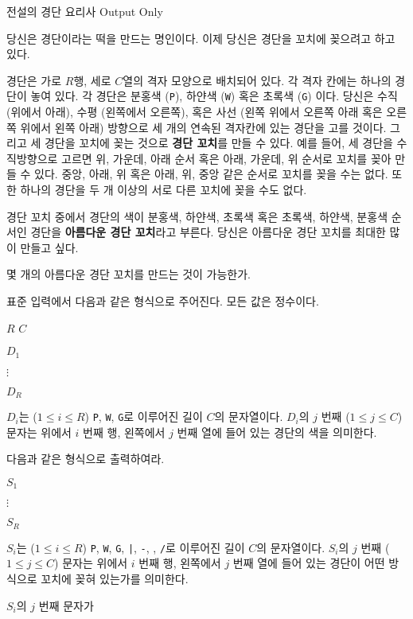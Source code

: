 \begin{problem}{전설의 경단 요리사}
	{}{Output Only}
	{}{}{}
	
	당신은 경단이라는 떡을 만드는 명인이다. 이제 당신은 경단을 꼬치에 꽂으려고 하고 있다.
	
	경단은 가로 $R$행, 세로 $C$열의 격자 모양으로 배치되어 있다. 각 격자 칸에는 하나의 경단이 놓여 있다. 각 경단은 분홍색 (\texttt{P}), 하얀색 (\texttt{W}) 혹은 초록색 (\texttt{G}) 이다. 당신은 수직 (위에서 아래), 수평 (왼쪽에서 오른쪽), 혹은 사선 (왼쪽 위에서 오른쪽 아래 혹은 오른쪽 위에서 왼쪽 아래) 방향으로 세 개의 연속된 격자칸에 있는 경단을 고를 것이다. 그리고 세 경단을 꼬치에 꽂는 것으로 \textbf{경단 꼬치}를 만들 수 있다. 예를 들어, 세 경단을 수직방향으로 고르면 위, 가운데, 아래 순서 혹은 아래, 가운데, 위 순서로 꼬치를 꽂아 만들 수 있다. 중앙, 아래, 위 혹은 아래, 위, 중앙 같은 순서로 꼬치를 꽂을 수는 없다. 또한 하나의 경단을 두 개 이상의 서로 다른 꼬치에 꽂을 수도 없다.
	
	경단 꼬치 중에서 경단의 색이 분홍색, 하얀색, 초록색 혹은 초록색, 하얀색, 분홍색 순서인 경단을 \textbf{아름다운 경단 꼬치}라고 부른다. 당신은 아름다운 경단 꼬치를 최대한 많이 만들고 싶다.
	
	몇 개의 아름다운 경단 꼬치를 만드는 것이 가능한가.

\InputFile

표준 입력에서 다음과 같은 형식으로 주어진다. 모든 값은 정수이다.

$R$ $C$

$D_1$

$\vdots$

$D_R$

$D_i$는 ($1 \le i \le R$) \texttt{P}, \texttt{W}, \texttt{G}로 이루어진 길이 $C$의 문자열이다. $D_i$의 $j$ 번째 ($1 \le j \le C$) 문자는 위에서 $i$ 번째 행, 왼쪽에서 $j$ 번째 열에 들어 있는 경단의 색을 의미한다.

\OutputFile

다음과 같은 형식으로 출력하여라.

$S_1$

$\vdots$

$S_R$

$S_i$는 ($1 \le i \le R$) \texttt{P}, \texttt{W}, \texttt{G}, \texttt{|}, \texttt{-}, \texttt{}, \texttt{/}로 이루어진 길이 $C$의 문자열이다. $S_i$의 $j$ 번째 ($1 \le j \le C$) 문자는 위에서 $i$ 번째 행, 왼쪽에서 $j$ 번째 열에 들어 있는 경단이 어떤 방식으로 꼬치에 꽂혀 있는가를 의미한다.

$S_i$의 $j$ 번째 문자가


\end{problem}
